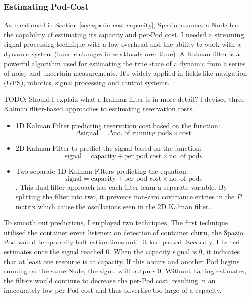 \subsubsection{Estimating Pod-Cost}
\label{sec:estimating-cost}
As mentioned in Section \ref{sec:spazio-cost-capacity}, Spazio assumes a Node
has the capability of estimating its capacity and per-Pod cost. I needed a
streaming signal processing technique with a low-overhead and the ability to
work with a dynamic system (handle changes in workloads over time). A Kalman filter
\cite{} is a powerful algorithm used for estimating the true state of a dynamic
from a series of noisy and uncertain measurements. It's widely applied in fields
like navigation (GPS), robotics, signal processing and control systems.

TODO: Should I explain what a Kalman filter is in more detail?
I devised three Kalman filter-based approaches to estimating reservation costs.
\begin{itemize}
    \item 1D Kalman Filter predicting reservation cost based on the function:
        \[\Delta \text{signal} = \Delta \text{no. of running pods} \times
        \text{cost}\]
    \item 2D Kalman Filter to predict the signal based on the function:
        \[\text{signal} = \text{capacity} + \text{per pod cost} \times \text{no.
        of pods}\]
    \item Two separate 1D Kalman Filters predicting the equation:
        \[\text{signal} = \text{capacity} + \text{per pod cost} \times \text{no.
        of pods}\].
        This dual filter approach has each filter learn a separate variable. By
        splitting the filter into two, it prevents non-zero covariance
        entries in the $P$ matrix which cause the oscillations seen in the 2D
        Kalman filter.
\end{itemize}
To smooth out predictions, I employed two techniques. The first technique
utilised the container event listener: on detection of container churn, the
Spazio Pod would temporarily halt estimations until it had passed. Secondly, I
halted estimates once the signal reached 0. When the capacity signal is 0, it
indicates that at least one resource is at capacity. If this occurs and another
Pod begins running on the same Node, the signal still outputs 0. Without halting
estimates, the filters would continue to decrease the per-Pod cost, resulting in
an inaccurately low per-Pod cost and thus advertise too large of a capacity.

